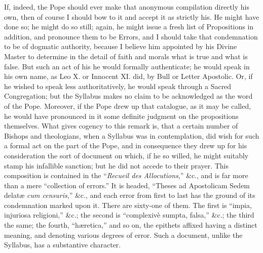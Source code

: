 If, indeed, the Pope should ever make that anonymous compilation
directly his own, then of course I should bow to it and accept it as
strictly his. He might have done so; he might do so still; again, he
might issue a fresh list of Propositions in addition, and pronounce them
to be Errors, and I should take that condemnation to be of dogmatic
authority, because I believe him appointed by his Divine Master to
determine in the detail of faith and morals what is true and what is
false. But such an act of his he would formally authenticate; he would
speak in his own name, as Leo X. or Innocent XI. did, by Bull or
Letter Apostolic. Or, if he wished to speak less authoritatively, he
would speak through a Sacred Congregation; but the Syllabus makes no
claim to be acknowledged as the word of the Pope. Moreover, if the Pope
drew up that catalogue, as it may be called, he would have pronounced in
it some definite judgment on the propositions themselves. What gives
cogency to this remark is, that a certain number of Bishops and
theologians, when a Syllabus was in contemplation, did wish for such a
formal act on the part of the Pope, and in consequence they drew up for
his consideration the sort of document on which, if he so willed, he
might suitably stamp his infallible sanction; but he did not accede to
their prayer. This composition is contained in the ``\emph{Recueil des
Allocutions},'' \&c., and is far more than a mere
``collection of errors.'' It is headed, ``Theses ad
Apostolicam Sedem delatæ \emph{cum censuris},'' \&c., and each
error from first to last has the ground of its condemnation marked upon
it. There are sixty-one of them. The first is ``impia, injuriosa
religioni,'' \&c.; the second is ``complexivè sumpta, falsa,''
\&c.; the third the same; the fourth, ``hæretica,'' and so
on, the epithets affixed having a distinct meaning, and denoting various
degrees of error. Such a document, unlike the Syllabus, has a
substantive character.


